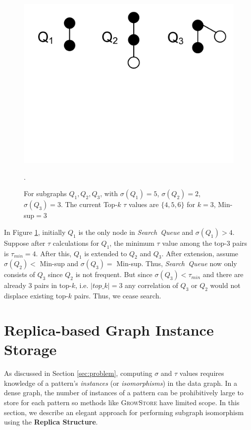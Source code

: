 \begin{figure}[t!]
	\centering
	\includegraphics[scale=0.32]{images/ceasing_condition}
	\vspace{-2mm}
	\caption{\scriptsize For subgraphs $Q_1,Q_2,Q_3$, with $\sigma(Q_1)=5$,
	$\sigma(Q_2)=2$, $\sigma(Q_3)=3$. The current {\sf Top-$k$} $\tau$ values
	are $\{4,5,6\}$ for $k=3$, {\sf Min-sup}$=3$}.
	\label{fig:ceasing_condition}
	\vspace{-6mm}
\end{figure}
\begin{exple}
	In Figure \ref{fig:ceasing_condition}, initially $Q_1$ is the
	only node in \emph{Search\ Queue} and $\sigma(Q_1)>4$. Suppose after
	$\tau$ calculations for $Q_1$, the minimum
	$\tau$ value among the {\sf top-$3$} pairs is $\tau{_{min}}=4$. After this,
	$Q_1$ is extended to $Q_2$ and $Q_3$. After extension, assume $\sigma(Q_2)<${\sf
	Min-sup} and $\sigma(Q_3)=$ {\sf Min-sup}. Thus, \emph{Search\ Queue} now only
	consists of $Q_3$ since $Q_2$ is not frequent. 
	But since $\sigma(Q_3)<\tau{_{min}}$ and there are already $3$ pairs in {\sf top-$k$}, i.e.
	$|top\_k|=3$ any correlation of $Q_3$ or $Q_2$ would not displace existing
	{\sf top-$k$} pairs. Thus, we cease search.
\end{exple}



\section{Replica-based Graph Instance Storage}
\label{subsec:replica-storage}
As discussed in Section \ref{sec:problem}, computing $\sigma$ and $\tau$
values requires knowledge of a pattern's \emph
{instances} (or \emph{isomorphisms}) in the
data graph. In a dense graph, the number of instances of a pattern can be
prohibitively large to store for each pattern so methods like \textsc{GrowStore} have limited
scope. In this section, we describe an elegant approach for performing subgraph
isomorphism using the \textbf{Replica Structure}.
 
